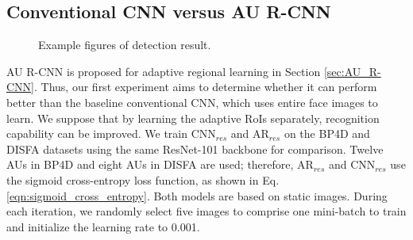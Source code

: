 \documentclass[5p,twocolumn]{elsarticle}
\begin{document}
 



\subsection{Conventional CNN versus AU R-CNN}

\begin{figure}
	\setlength{\abovecaptionskip}{0pt}
	\setlength{\belowcaptionskip}{0pt}
	\begin{adjustbox}{max width=0.5\textwidth,center}
	\end{adjustbox}
	\caption{Example figures of detection result.}
	\label{fig:detection_result}
\end{figure}



AU R-CNN is proposed for adaptive regional learning in Section \ref{sec:AU_R-CNN}. Thus, our first experiment aims to determine whether it can perform better than the baseline conventional CNN, which uses entire face images to learn. We suppose that by learning the adaptive RoIs separately, recognition capability can be improved. We train CNN$_{res}$ and AR$_{res}$ on the BP4D and DISFA datasets using the same ResNet-101 backbone for comparison. Twelve AUs in BP4D and eight AUs in DISFA are used; therefore, AR$_{res}$ and CNN$_{res}$ use the sigmoid cross-entropy loss function, as shown in Eq. \ref{eqn:sigmoid_cross_entropy}. Both models are based on static images. During each iteration, we randomly select five images to comprise one mini-batch to train and initialize the learning rate to 0.001.
\end{document}
